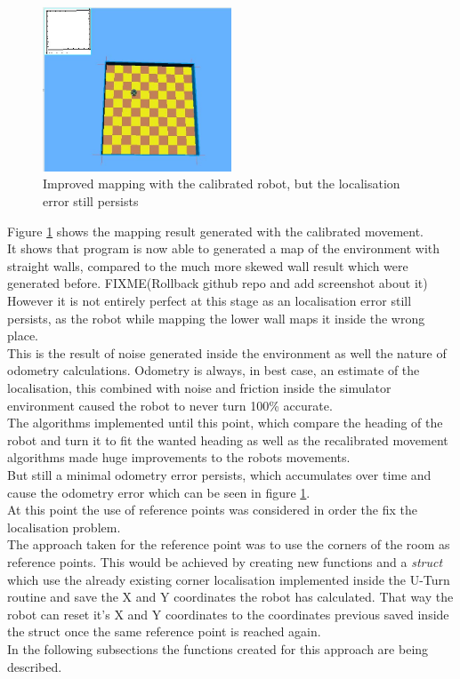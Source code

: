 \begin{figure}[h]
\centering
\includegraphics[width = 0.5\textwidth]{../../figures/odometry_error}
\caption{Improved mapping with the calibrated robot, but the localisation error still persists}
\label{odometry_error}
\end{figure}

Figure \ref{odometry_error} shows the mapping result generated with the calibrated movement.\\
It shows that program is now able to generated a map of the environment with straight walls, compared to the much more skewed wall result which were generated before.
FIXME(Rollback github repo and add screenshot about it)\\

However it is not entirely perfect at this stage as an localisation error still persists, as the robot while mapping the lower wall maps it inside the wrong place. \\
This is the result of noise generated inside the environment as well the nature of odometry calculations.
Odometry is always, in best case, an estimate of the localisation, this combined with noise and friction inside the simulator environment caused the robot to never turn 100\% accurate. \\
The algorithms implemented until this point, which compare the heading of the robot and turn it to fit the wanted heading as well as the recalibrated movement algorithms made huge improvements to the robots movements.\\
But still a minimal odometry error persists, which accumulates over time and cause the odometry error which can be seen in figure \ref{odometry_error}. \\[3ex]

At this point the use of reference points was considered in order the fix the localisation problem.\\
The approach taken for the reference point was to use the corners of the room as reference points.
This would be achieved by creating new functions and a \textit{struct }which use the already existing corner localisation implemented inside the U-Turn routine and save the X and Y coordinates the robot has calculated.
That way the robot can reset it's X and Y coordinates to the coordinates previous saved inside the struct once the same reference point is reached again.\\
In the following subsections the functions created for this approach are being described.

